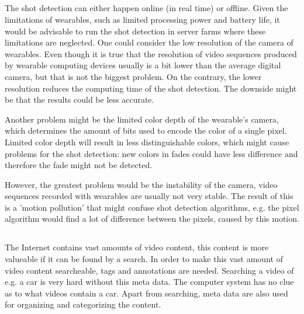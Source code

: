 \subsection[Given a video sequence produced by a wearable computing device like Google Glass (a/o), what issues does a method for video shot detection need to overcome?]{}
The shot detection can either happen online (in real time) or offline. Given the limitations of wearables, such as limited processing power and battery life, it would be advisable to run the shot detection in server farms where these limitations are neglected. One could consider the low resolution of the camera of wearables. Even though it is true that the resolution of video sequences produced by wearable computing devices usually is a bit lower than the average digital camera, but that is not the biggest problem. On the contrary, the lower resolution reduces the computing time of the shot detection. The downside might be that the results could be less accurate.

Another problem might be the limited color depth of the wearable's camera, which determines the amount of bits used to encode the color of a single pixel. Limited color depth will result in less distinguishable colors, which might cause problems for the shot detection: new colors in fades could have less difference and therefore the fade might not be detected. 

However, the greatest problem would be the instability of the camera, video sequences recorded with wearables are usually not very stable. The result of this is a 'motion pollution' that might confuse shot detection algorithms, e.g. the pixel algorithm would find a lot of difference between the pixels, caused by this motion.
\\
\subsection[Why is it important to add meta data to video content?]{}
The Internet contains vast amounts of video content, this content is more valueable if it can be found by a search. In order to make this vast amount of video content searcheable, tags and annotations are needed. Searching a video of e.g. a car is very hard without this meta data. The computer system has no clue as to what videos contain a car. Apart from searching, meta data are also used for organizing and categorizing the content.
\\
